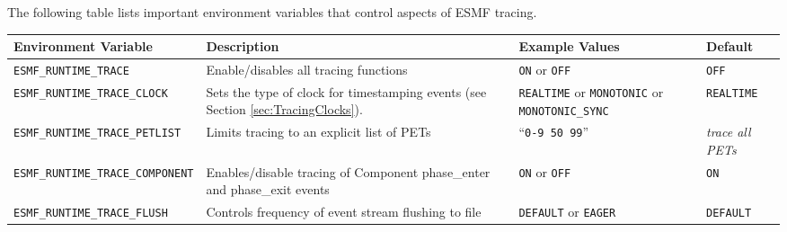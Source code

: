 The following table lists important environment variables that control
aspects of ESMF tracing.

\begin{tabular} {|p{6cm}|p{8cm}|p{6cm}|p{6cm}|}
     \hline\hline
     {\bf Environment Variable} & {\bf Description} & {\bf Example Values} & {\bf Default}\\
     \hline\hline
     {\tt ESMF\_RUNTIME\_TRACE} & Enable/disables all tracing functions & {\tt ON} or {\tt OFF} & {\tt OFF} \\
     \hline\hline                    
     {\tt ESMF\_RUNTIME\_TRACE\_CLOCK} & Sets the type of clock for timestamping events (see Section \ref{sec:TracingClocks}). & {\tt REALTIME} or {\tt MONOTONIC} or {\tt MONOTONIC\_SYNC} & {\tt REALTIME}\\
     \hline\hline
     {\tt ESMF\_RUNTIME\_TRACE\_PETLIST} & Limits tracing to an explicit list of PETs & ``{\tt 0-9 50 99}'' & {\em trace all PETs}\\
     \hline\hline
     {\tt ESMF\_RUNTIME\_TRACE\_COMPONENT} & Enables/disable tracing of Component phase\_enter and phase\_exit events & {\tt ON} or {\tt OFF} & {\tt ON} \\
     \hline\hline
     {\tt ESMF\_RUNTIME\_TRACE\_FLUSH} & Controls frequency of event stream flushing to file & {\tt DEFAULT} or {\tt EAGER} & {\tt DEFAULT} \\
     \hline\hline
\end{tabular}



